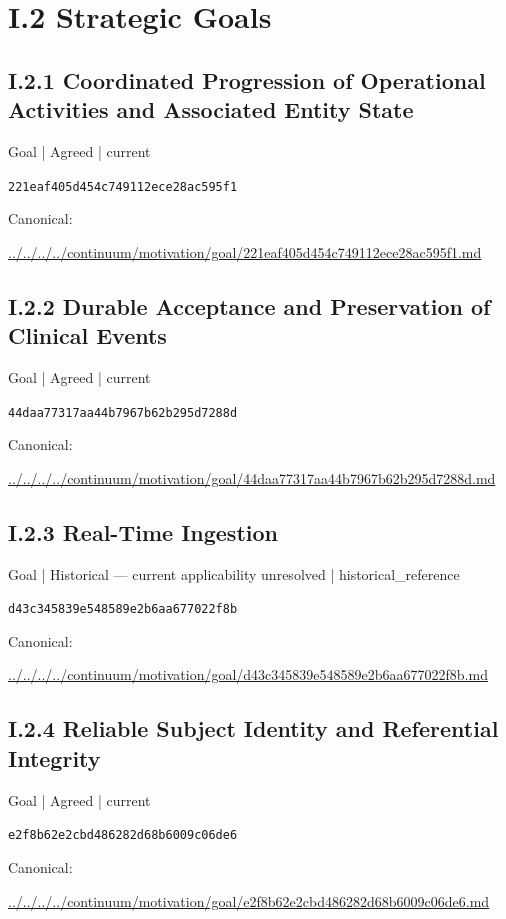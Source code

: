 \documentclass[10pt,a4paper]{article}
\begin{document}
\section*{I.2 Strategic Goals}
\subsection*{I.2.1 Coordinated Progression of Operational Activities and Associated Entity State}
\label{element-221eaf405d454c749112ece28ac595f1}
{\small Goal | Agreed | current}\par
\texttt{221eaf405d454c749112ece28ac595f1}\par
Canonical: \par
{\footnotesize\url{../../../../continuum/motivation/goal/221eaf405d454c749112ece28ac595f1.md}}\par
\subsection*{I.2.2 Durable Acceptance and Preservation of Clinical Events}
\label{element-44daa77317aa44b7967b62b295d7288d}
{\small Goal | Agreed | current}\par
\texttt{44daa77317aa44b7967b62b295d7288d}\par
Canonical: \par
{\footnotesize\url{../../../../continuum/motivation/goal/44daa77317aa44b7967b62b295d7288d.md}}\par
\subsection*{I.2.3 Real-Time Ingestion}
\label{element-d43c345839e548589e2b6aa677022f8b}
{\small Goal | Historical — current applicability unresolved | historical\_reference}\par
\texttt{d43c345839e548589e2b6aa677022f8b}\par
Canonical: \par
{\footnotesize\url{../../../../continuum/motivation/goal/d43c345839e548589e2b6aa677022f8b.md}}\par
\subsection*{I.2.4 Reliable Subject Identity and Referential Integrity}
\label{element-e2f8b62e2cbd486282d68b6009c06de6}
{\small Goal | Agreed | current}\par
\texttt{e2f8b62e2cbd486282d68b6009c06de6}\par
Canonical: \par
{\footnotesize\url{../../../../continuum/motivation/goal/e2f8b62e2cbd486282d68b6009c06de6.md}}\par
\end{document}
